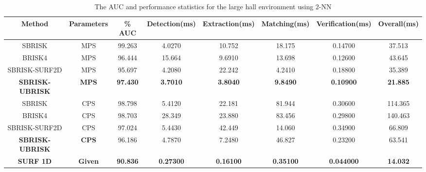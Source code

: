 \documentclass{article}
\begin{document}
\begin{table}

\footnotesize
\caption{The AUC and performance statistics for the large hall environment
using 2-NN}


\begin{tabular}{|c|c|c|c|c|c|c|c|}
\hline 
\textbf{Method} & \textbf{Parameters} & \textbf{\% AUC} & \textbf{Detection(ms)} & \textbf{Extraction(ms)} & \textbf{Matching(ms)} & \textbf{Verification(ms)} & \textbf{Overall(ms)}\tabularnewline
\hline 
\hline 
SBRISK & MPS & 99.263 & 4.0270 & 10.752 & 18.175 & 0.14700 & 37.513\tabularnewline
\hline 
BRISK4 & MPS & 96.444 & 15.664 & 9.6910 & 13.698 & 0.12600 & 43.645\tabularnewline
\hline 
SBRISK-SURF2D & MPS & 95.697 & 4.2080 & 22.242 & 4.2410 & 0.18800 & 35.389\tabularnewline
\hline 
\textbf{SBRISK-UBRISK} & \textbf{MPS} & \textbf{97.430} & \textbf{3.7010} & \textbf{3.8040} & \textbf{9.8490} & \textbf{0.10900} & \textbf{21.885}\tabularnewline
\hline 
SBRISK & CPS & 98.798 & 5.4120 & 22.181 & 81.944 & 0.30600 & 114.365\tabularnewline
\hline 
BRISK4 & CPS & 98.703 & 28.349 & 23.880 & 83.456 & 0.29800 & 140.463\tabularnewline
\hline 
SBRISK-SURF2D & CPS & 97.024 & 5.4430 & 42.449 & 14.060 & 0.34900 & 66.809\tabularnewline
\hline 
\textbf{SBRISK-UBRISK} & \textbf{CPS} & 96.186 & 4.7870 & 7.2480 & 46.827 & 0.23200 & 63.541\tabularnewline
\hline 
\textbf{SURF 1D} & \textbf{Given} & \textbf{90.836} & \textbf{0.27300} & \textbf{0.16100} & \textbf{0.35100} & \textbf{0.044000} & \textbf{14.032}\tabularnewline
\hline 
\end{tabular}

\end{table}
\end{document}
